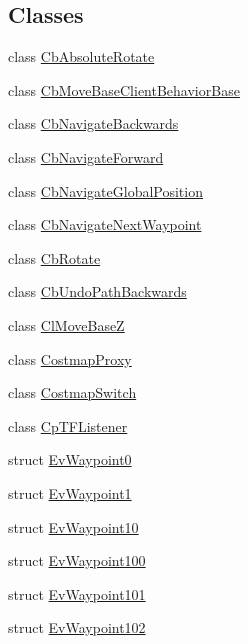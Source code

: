 \subsection*{Classes}
\begin{DoxyCompactItemize}
\item 
class \hyperlink{classcl__move__base__z_1_1CbAbsoluteRotate}{Cb\+Absolute\+Rotate}
\item 
class \hyperlink{classcl__move__base__z_1_1CbMoveBaseClientBehaviorBase}{Cb\+Move\+Base\+Client\+Behavior\+Base}
\item 
class \hyperlink{classcl__move__base__z_1_1CbNavigateBackwards}{Cb\+Navigate\+Backwards}
\item 
class \hyperlink{classcl__move__base__z_1_1CbNavigateForward}{Cb\+Navigate\+Forward}
\item 
class \hyperlink{classcl__move__base__z_1_1CbNavigateGlobalPosition}{Cb\+Navigate\+Global\+Position}
\item 
class \hyperlink{classcl__move__base__z_1_1CbNavigateNextWaypoint}{Cb\+Navigate\+Next\+Waypoint}
\item 
class \hyperlink{classcl__move__base__z_1_1CbRotate}{Cb\+Rotate}
\item 
class \hyperlink{classcl__move__base__z_1_1CbUndoPathBackwards}{Cb\+Undo\+Path\+Backwards}
\item 
class \hyperlink{classcl__move__base__z_1_1ClMoveBaseZ}{Cl\+Move\+BaseZ}
\item 
class \hyperlink{classcl__move__base__z_1_1CostmapProxy}{Costmap\+Proxy}
\item 
class \hyperlink{classcl__move__base__z_1_1CostmapSwitch}{Costmap\+Switch}
\item 
class \hyperlink{classcl__move__base__z_1_1CpTFListener}{Cp\+T\+F\+Listener}
\item 
struct \hyperlink{structcl__move__base__z_1_1EvWaypoint0}{Ev\+Waypoint0}
\item 
struct \hyperlink{structcl__move__base__z_1_1EvWaypoint1}{Ev\+Waypoint1}
\item 
struct \hyperlink{structcl__move__base__z_1_1EvWaypoint10}{Ev\+Waypoint10}
\item 
struct \hyperlink{structcl__move__base__z_1_1EvWaypoint100}{Ev\+Waypoint100}
\item 
struct \hyperlink{structcl__move__base__z_1_1EvWaypoint101}{Ev\+Waypoint101}
\item 
struct \hyperlink{structcl__move__base__z_1_1EvWaypoint102}{Ev\+Waypoint102}
\item 

\end{DoxyCompactItemize}
